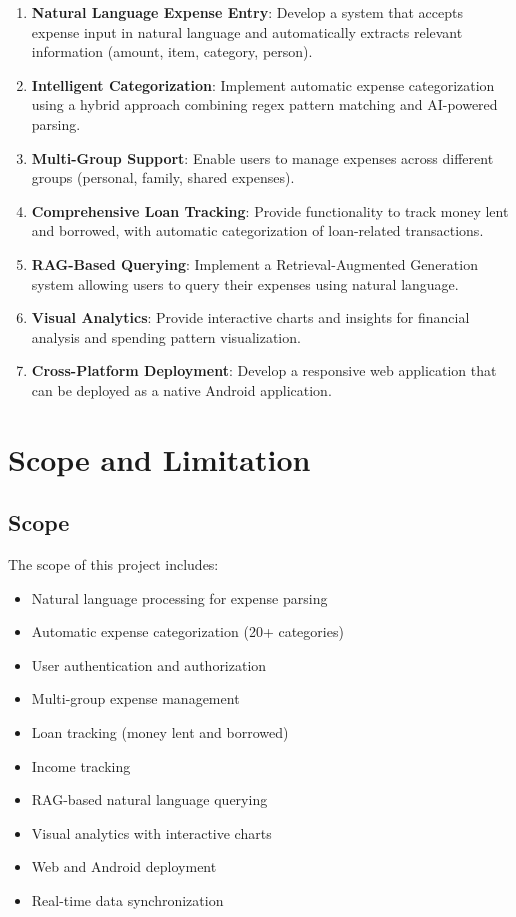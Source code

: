 \begin{enumerate}
    \item \textbf{Natural Language Expense Entry}: Develop a system that accepts expense input in natural language and automatically extracts relevant information (amount, item, category, person).
    
    \item \textbf{Intelligent Categorization}: Implement automatic expense categorization using a hybrid approach combining regex pattern matching and AI-powered parsing.
    
    \item \textbf{Multi-Group Support}: Enable users to manage expenses across different groups (personal, family, shared expenses).
    
    \item \textbf{Comprehensive Loan Tracking}: Provide functionality to track money lent and borrowed, with automatic categorization of loan-related transactions.
    
    \item \textbf{RAG-Based Querying}: Implement a Retrieval-Augmented Generation system allowing users to query their expenses using natural language.
    
    \item \textbf{Visual Analytics}: Provide interactive charts and insights for financial analysis and spending pattern visualization.
    
    \item \textbf{Cross-Platform Deployment}: Develop a responsive web application that can be deployed as a native Android application.
\end{enumerate}

\section{Scope and Limitation}

\subsection{Scope}

The scope of this project includes:

\begin{itemize}
    \item Natural language processing for expense parsing
    \item Automatic expense categorization (20+ categories)
    \item User authentication and authorization
    \item Multi-group expense management
    \item Loan tracking (money lent and borrowed)
    \item Income tracking
    \item RAG-based natural language querying
    \item Visual analytics with interactive charts
    \item Web and Android deployment
    \item Real-time data synchronization
\end{itemize}

